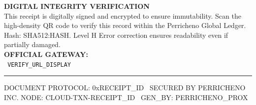 \documentclass[7pt,a4paper]{extarticle}
\begin{document}
\vfill

\noindent
\begin{minipage}[b]{0.65\textwidth}
    \textbf{DIGITAL INTEGRITY VERIFICATION} \\
    \fontsize{6.5pt}{8.5pt}\selectfont \color{gray}
    This receipt is digitally signed and encrypted to ensure immutability. Scan the high-density QR code to verify this record within the Perricheno Global Ledger. Hash: SHA512:{{HASH}}. Level H Error correction ensures readability even if partially damaged. \\
    
    \vspace{2mm}
    \textbf{OFFICIAL GATEWAY:} \\
    \texttt{\fontsize{9pt}{9pt}\selectfont \color{black} {{VERIFY_URL_DISPLAY}}}
\end{minipage}%
\hfill
\begin{minipage}[b]{52mm}
    \centering
\end{minipage}
\vspace{2mm}

\noindent\hrule\vspace{1mm}
\begin{center}
    {\fontsize{5.5pt}{5.5pt}\selectfont DOCUMENT PROTOCOL: 0x{{RECEIPT_ID}} \textbullet\ SECURED BY PERRICHENO INC. NODE: CLOUD-TXN-{{RECEIPT_ID}} \textbullet\ GEN\_BY: PERRICHENO\_PROX}
\end{center}
\end{document}
